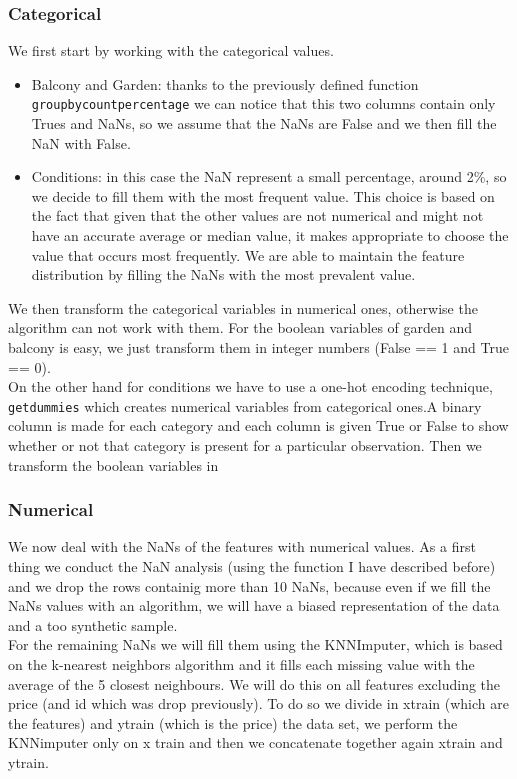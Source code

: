 \documentclass[10pt, notitlepage]{article}
\begin{document}
\color{blue}
\subsubsection{Categorical}
\color{black}
We first start by working with the categorical values.
\begin{itemize}
    \item Balcony and Garden: thanks to the previously defined function \texttt{groupby\textunderscore count\textunderscore percentage} we can notice that this two columns contain only Trues and NaNs, so we assume that the NaNs are False and we then fill the NaN with False. 
    \item Conditions: in this case the NaN represent a small percentage, around 2\%, so we decide to fill them with the most frequent value. This choice is based on the fact that given that the other values are  not numerical and might not have an accurate average or median value, it makes appropriate to choose the value that occurs most frequently. We are able to maintain the feature distribution by filling the NaNs with the most prevalent value.
\end{itemize}
We then transform the categorical variables in numerical ones, otherwise the algorithm can not work with them. For the boolean variables of garden and balcony is easy, we just transform them in integer numbers (False == 1 and True == 0). 
\\
On the other hand for conditions we have to use a one-hot encoding technique, \texttt{get\textunderscore dummies} which creates numerical variables from categorical ones.A binary column is made for each category and each column is given True or False to show whether or not that category is present for a particular observation. Then we transform the boolean variables in 

\color{blue}
\subsubsection{Numerical}
\color{black}
We now deal with the NaNs of the features with numerical values. As a first thing we conduct the NaN analysis (using the function I have described before) and we drop the rows containig more than 10 NaNs, because even if we fill the NaNs values with an algorithm, we will have a biased representation of the data and a too synthetic sample. 
\\
For the remaining NaNs we will fill them using the KNNImputer, which is based on the k-nearest neighbors algorithm and it fills each missing value with the average of the 5 closest neighbours. We will do this on all features excluding the price (and id which was drop previously). To do so we divide in x\textunderscore train (which are the features) and y\textunderscore train (which is the price) the data set, we perform the KNNimputer only on x \textunderscore train and then we concatenate together again x\textunderscore train and y\textunderscore train. 
\end{document}

